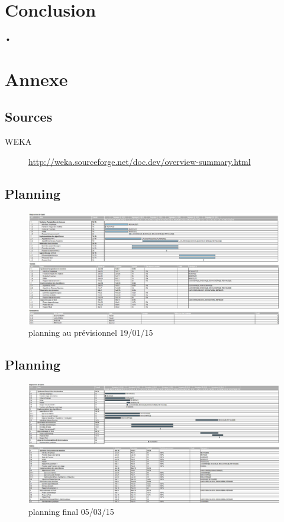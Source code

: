\documentclass[10pt,a4paper]{report}
\begin{document}
\section{Conclusion}
\begin{flushleft}
•
\end{flushleft}



\section{Annexe}
\subsection*{Sources}
\begin{description}
	\item[WEKA] \url{http://weka.sourceforge.net/doc.dev/overview-summary.html}
\end{description}
\newpage

\begin{landscape}
\subsection*{Planning}

\begin{figure}[!h]
	\center
		\includegraphics[scale=0.5]{./Ressource/planning_previsionnel.png}
 	\caption{planning au prévisionnel 19/01/15}
\end{figure}
\newpage
\subsection*{Planning}
\begin{figure}[!h]
	\center
		\includegraphics[scale=0.5]{./Ressource/planning_final.png}
 	\caption{planning final 05/03/15}
\end{figure}
\end{landscape}
\end{document}

